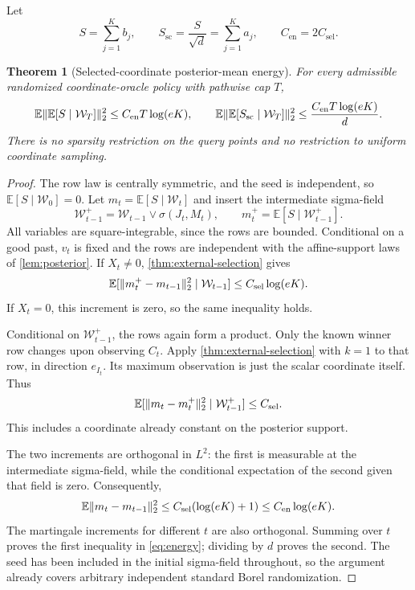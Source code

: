 \documentclass[11pt]{article}
\numberwithin{equation}{section}
\newtheorem{theorem}{Theorem}[section]
\theoremstyle{definition}
\theoremstyle{remark}
\newcommand{\E}{\mathbb E}
\newcommand{\cW}{\mathcal W}
\newcommand{\Csel}{C_{\mathrm{sel}}}
\newcommand{\Cen}{C_{\mathrm{en}}}
\DeclarePairedDelimiter{\norm}{\lVert}{\rVert}
\begin{document}
Let
\begin{equation}\label{eq:aggregate}
S=\sum_{j=1}^K b_j,\qquad S_{\mathrm{sc}}=\frac S{\sqrt d}=\sum_{j=1}^K a_j,
\qquad \Cen=2\Csel.
\end{equation}

\begin{theorem}[Selected-coordinate posterior-mean energy]\label{thm:energy}
For every admissible randomized coordinate-oracle policy with pathwise cap $T$,
\begin{equation}\label{eq:energy}
\E\norm{\E[S\mid\cW_T]}_2^2\le\Cen T\log(eK),\qquad
\E\norm{\E[S_{\mathrm{sc}}\mid\cW_T]}_2^2
\le\frac{\Cen T\log(eK)}d.
\end{equation}
There is no sparsity restriction on the query points and no restriction to uniform coordinate sampling.
\end{theorem}
\begin{proof}
The row law is centrally symmetric, and the seed is independent, so $\E[S\mid\cW_0]=0$. Let $m_t=\E[S\mid\cW_t]$ and insert the intermediate sigma-field
\[
\cW_{t-1}^{+}=\cW_{t-1}\vee\sigma(J_t,M_t),\qquad
m_t^+=\E[S\mid\cW_{t-1}^{+}].
\]
All variables are square-integrable, since the rows are bounded. Conditional on a good past, $v_t$ is fixed and the rows are independent with the affine-support laws of \cref{lem:posterior}. If $X_t\ne0$, \cref{thm:external-selection} gives
\begin{equation}\label{eq:score-energy}
\E[\norm{m_t^+-m_{t-1}}_2^2\mid\cW_{t-1}]
\le\Csel\log(eK).
\end{equation}
If $X_t=0$, this increment is zero, so the same inequality holds.

Conditional on $\cW_{t-1}^{+}$, the rows again form a product. Only the known winner row changes upon observing $C_t$. Apply \cref{thm:external-selection} with $k=1$ to that row, in direction $e_{I_t}$. Its maximum observation is just the scalar coordinate itself. Thus
\begin{equation}\label{eq:coordinate-energy}
\E[\norm{m_t-m_t^+}_2^2\mid\cW_{t-1}^{+}]\le\Csel.
\end{equation}
This includes a coordinate already constant on the posterior support.

The two increments are orthogonal in $L^2$: the first is measurable at the intermediate sigma-field, while the conditional expectation of the second given that field is zero. Consequently,
\[
\E\norm{m_t-m_{t-1}}_2^2
\le\Csel(\log(eK)+1)\le\Cen\log(eK).
\]
The martingale increments for different $t$ are also orthogonal. Summing over $t$ proves the first inequality in \eqref{eq:energy}; dividing by $d$ proves the second. The seed has been included in the initial sigma-field throughout, so the argument already covers arbitrary independent standard Borel randomization.
\end{proof}
\end{document}
